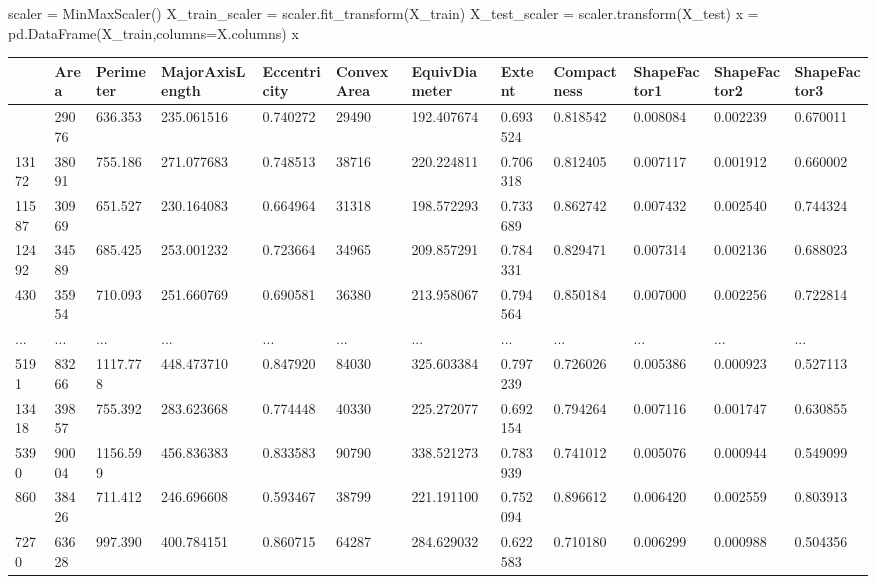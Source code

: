 \documentclass[
  letterpaper,
]{krantz}
\makeatletter
\newenvironment{Shaded}{\begin{snugshade}}{\end{snugshade}}
\newcommand{\NormalTok}[1]{\textcolor[rgb]{0.00,0.23,0.31}{#1}}
\newcommand{\OperatorTok}[1]{\textcolor[rgb]{0.37,0.37,0.37}{#1}}
\newenvironment{kframe}{%
\medskip{}
\setlength{\fboxsep}{.8em}
 \def\at@end@of@kframe{}%
 \ifinner\ifhmode%
  \def\at@end@of@kframe{\end{minipage}}%
  \begin{minipage}{\columnwidth}%
 \fi\fi%
 \def\FrameCommand##1{\hskip\@totalleftmargin \hskip-\fboxsep
 \colorbox{shadecolor}{##1}\hskip-\fboxsep
     \hskip-\linewidth \hskip-\@totalleftmargin \hskip\columnwidth}%
 \MakeFramed {\advance\hsize-\width
   \@totalleftmargin\z@ \linewidth\hsize
   \@setminipage}}%
 {\par\unskip\endMakeFramed%
 \at@end@of@kframe}
\renewenvironment{Shaded}{\begin{kframe}}{\end{kframe}}
\makeatother
\begin{document}
\begin{Shaded}
\begin{Highlighting}[]
\NormalTok{scaler }\OperatorTok{=}\NormalTok{ MinMaxScaler()}
\NormalTok{X\_train\_scaler }\OperatorTok{=}\NormalTok{ scaler.fit\_transform(X\_train)}
\NormalTok{X\_test\_scaler }\OperatorTok{=}\NormalTok{ scaler.transform(X\_test)}
\NormalTok{x }\OperatorTok{=}\NormalTok{ pd.DataFrame(X\_train,columns}\OperatorTok{=}\NormalTok{X.columns)}
\NormalTok{x}
\end{Highlighting}
\end{Shaded}

\begin{longtable}[]{@{}llllllllllll@{}}
\toprule\noalign{}
& Area & Perimeter & MajorAxisLength & Eccentricity & ConvexArea &
EquivDiameter & Extent & Compactness & ShapeFactor1 & ShapeFactor2 &
ShapeFactor3 \\
\midrule\noalign{}
\endhead
\bottomrule\noalign{}
\endlastfoot
11073 & 29076 & 636.353 & 235.061516 & 0.740272 & 29490 & 192.407674 &
0.693524 & 0.818542 & 0.008084 & 0.002239 & 0.670011 \\
13172 & 38091 & 755.186 & 271.077683 & 0.748513 & 38716 & 220.224811 &
0.706318 & 0.812405 & 0.007117 & 0.001912 & 0.660002 \\
11587 & 30969 & 651.527 & 230.164083 & 0.664964 & 31318 & 198.572293 &
0.733689 & 0.862742 & 0.007432 & 0.002540 & 0.744324 \\
12492 & 34589 & 685.425 & 253.001232 & 0.723664 & 34965 & 209.857291 &
0.784331 & 0.829471 & 0.007314 & 0.002136 & 0.688023 \\
430 & 35954 & 710.093 & 251.660769 & 0.690581 & 36380 & 213.958067 &
0.794564 & 0.850184 & 0.007000 & 0.002256 & 0.722814 \\
... & ... & ... & ... & ... & ... & ... & ... & ... & ... & ... & ... \\
5191 & 83266 & 1117.778 & 448.473710 & 0.847920 & 84030 & 325.603384 &
0.797239 & 0.726026 & 0.005386 & 0.000923 & 0.527113 \\
13418 & 39857 & 755.392 & 283.623668 & 0.774448 & 40330 & 225.272077 &
0.692154 & 0.794264 & 0.007116 & 0.001747 & 0.630855 \\
5390 & 90004 & 1156.599 & 456.836383 & 0.833583 & 90790 & 338.521273 &
0.783939 & 0.741012 & 0.005076 & 0.000944 & 0.549099 \\
860 & 38426 & 711.412 & 246.696608 & 0.593467 & 38799 & 221.191100 &
0.752094 & 0.896612 & 0.006420 & 0.002559 & 0.803913 \\
7270 & 63628 & 997.390 & 400.784151 & 0.860715 & 64287 & 284.629032 &
0.622583 & 0.710180 & 0.006299 & 0.000988 & 0.504356 \\
\end{longtable}
\end{document}
